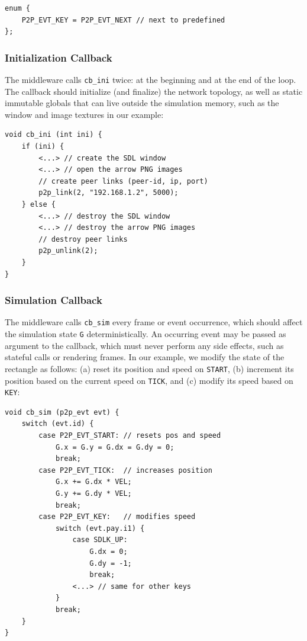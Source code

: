\documentclass[fleqn,10pt]{SelfArx}
\newcommand{\code}[1]  {\texttt{\footnotesize{#1}}}
\begin{document}
{\footnotesize
\begin{verbatim}
enum {
    P2P_EVT_KEY = P2P_EVT_NEXT // next to predefined
};
\end{verbatim}
}

\subsubsection{Initialization Callback}
\label{sec.tml.api.cb_ini}

The middleware calls \code{cb\_ini} twice: at the beginning and at the end of
the loop.
The callback should initialize (and finalize) the network topology, as well as
static immutable globals that can live outside the simulation memory, such as
the window and image textures in our example:

{\footnotesize
\begin{verbatim}
void cb_ini (int ini) {
    if (ini) {
        <...> // create the SDL window
        <...> // open the arrow PNG images
        // create peer links (peer-id, ip, port)
        p2p_link(2, "192.168.1.2", 5000);
    } else {
        <...> // destroy the SDL window
        <...> // destroy the arrow PNG images
        // destroy peer links
        p2p_unlink(2);
    }
}
\end{verbatim}
}

\subsubsection{Simulation Callback}
\label{sec.tml.api.cb_sim}

The middleware calls \code{cb\_sim} every frame or event occurrence, which
should affect the simulation state \code{G} deterministically.
An occurring event may be passed as argument to the callback, which must never
perform any side effects, such as stateful calls or rendering frames.
In our example, we modify the state of the rectangle as follows:
    (a) reset its position and speed on \code{START},
    (b) increment its position based on the current speed on \code{TICK}, and
    (c) modify its speed based on \code{KEY}:

{\footnotesize
\begin{verbatim}
void cb_sim (p2p_evt evt) {
    switch (evt.id) {
        case P2P_EVT_START: // resets pos and speed
            G.x = G.y = G.dx = G.dy = 0;
            break;
        case P2P_EVT_TICK:  // increases position
            G.x += G.dx * VEL;
            G.y += G.dy * VEL;
            break;
        case P2P_EVT_KEY:   // modifies speed
            switch (evt.pay.i1) {
                case SDLK_UP:
                    G.dx = 0;
                    G.dy = -1;
                    break;
                <...> // same for other keys
            }
            break;
    }
}
\end{verbatim}
}
\end{document}
